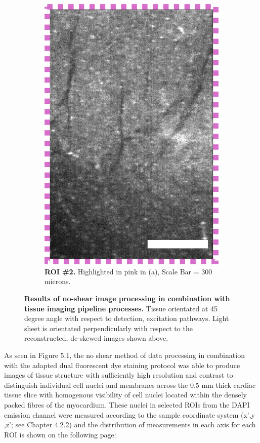 \begin{figure}[H]
\begin{subfigure}[t]{0.475\textwidth}
\includegraphics[width=0.75\linewidth]{Images/ROI2.png}
\caption{\textbf{ROI \#2.} Highlighted in pink in (a), Scale Bar = 300 microns.}
\end{subfigure}
\caption{\textbf{Results of no-shear image processing in combination with tissue imaging pipeline processes.} Tissue orientated at 45 degree angle with respect to detection, excitation pathways. Light sheet is orientated perpendicularly with respect to the reconstructed, de-skewed images shown above.}
\end{figure}

As seen in Figure 5.1, the no shear method of data processing in combination with the adapted dual fluorescent dye staining protocol was able to produce images of tissue structure with sufficiently high resolution and contrast to distinguish individual cell nuclei and membranes across the 0.5 mm thick cardiac tissue slice with homogenous visibility of cell nuclei located within the densely packed fibres of the myocardium. These nuclei in selected ROIs from the DAPI emission channel were measured according to the sample coordinate system (x',y ,z'; see Chapter 4.2.2) and the distribution of measurements in each axis for each ROI is shown on the following page:

